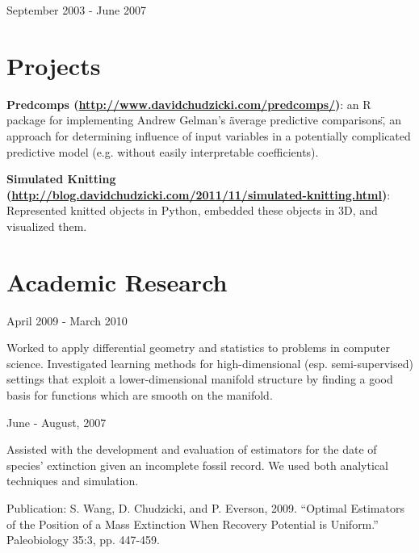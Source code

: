 \documentclass[letterpaper]{resume}
\begin{document}
{September 2003 - June 2007}
{}
{}

\section{Projects}
\begin{compactitem}
\item \textbf{Predcomps (\href{http://www.davidchudzicki.com/predcomps/}{http://www.davidchudzicki.com/predcomps/})}: an R package for implementing Andrew Gelman's \"average predictive comparisons\", an approach for determining influence of input variables in a potentially complicated predictive model (e.g. without easily interpretable coefficients). 
\end{compactitem}

\begin{compactitem}
\item \textbf{Simulated Knitting (\href{http://blog.davidchudzicki.com/2011/11/simulated-knitting.html}{http://blog.davidchudzicki.com/2011/11/simulated-knitting.html})}: Represented knitted objects in Python, embedded these objects in 3D, and visualized them.
\end{compactitem}

\section{Academic Research}

{April 2009 - March 2010}
{}
{}
\begin{compactitem}
\item Worked to apply differential geometry and 
statistics to problems in computer science. Investigated learning methods for 
high-dimensional (esp. semi-supervised) settings that exploit a lower-dimensional manifold structure by finding a good 
basis for functions which are smooth on the manifold.
\end{compactitem}

{June - August, 2007}
{}
{}
\begin{compactitem}
\item Assisted with the development and evaluation of estimators for the
date of species' extinction given an incomplete fossil record. We used
both analytical techniques and simulation.

\begin{compactitem}

\item Publication: S. Wang, D. Chudzicki, and P. Everson, 2009. ``Optimal Estimators of the Position of a Mass Extinction When Recovery Potential is Uniform.'' Paleobiology 35:3, pp. 447-459. 

\end{compactitem}

\end{compactitem}
\end{document}
